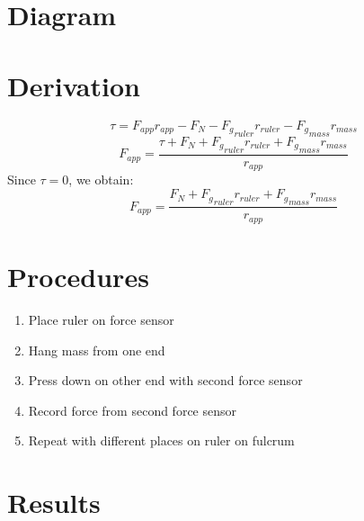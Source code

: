 \documentclass{article}
\begin{document}
\section*{Diagram}
\section*{Derivation}
\[\tau = F_{app}r_{app} - F_N - {F_g}_{ruler}r_{ruler} - {F_g}_{mass}r_{mass}\]
\[F_{app} = \frac{\tau + F_N + {F_g}_{ruler}r_{ruler} + {F_g}_{mass}r_{mass}}{r_{app}}\]
Since $\tau = 0$, we obtain:
\[F_{app} = \frac{F_N + {F_g}_{ruler}r_{ruler} + {F_g}_{mass}r_{mass}}{r_{app}}\]
\section*{Procedures}
\begin{enumerate}
    \item Place ruler on force sensor
    \item Hang mass from one end
    \item Press down on other end with second force sensor
    \item Record force from second force sensor
    \item Repeat with different places on ruler on fulcrum
\end{enumerate}
\section*{Results}
\end{document}
